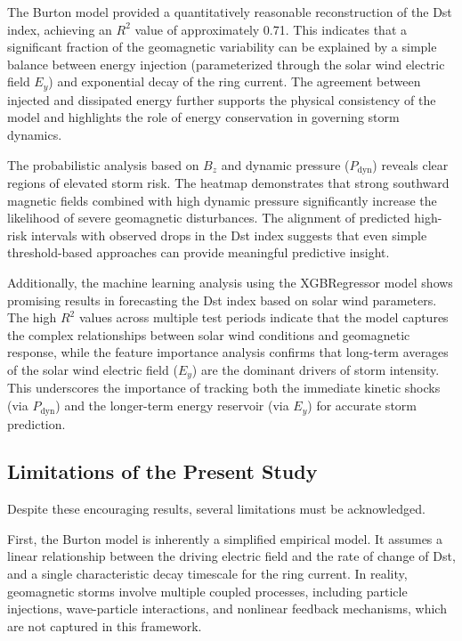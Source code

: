 \documentclass[12pt]{article}
\begin{document}
The Burton model provided a quantitatively reasonable reconstruction of the Dst index, achieving an $R^2$ value of approximately 0.71. This indicates that a significant fraction of the geomagnetic variability can be explained by a simple balance between energy injection (parameterized through the solar wind electric field $E_y$) and exponential decay of the ring current. The agreement between injected and dissipated energy further supports the physical consistency of the model and highlights the role of energy conservation in governing storm dynamics.

The probabilistic analysis based on $B_z$ and dynamic pressure ($P_{\mathrm{dyn}}$) reveals clear regions of elevated storm risk. The heatmap demonstrates that strong southward magnetic fields combined with high dynamic pressure significantly increase the likelihood of severe geomagnetic disturbances. The alignment of predicted high-risk intervals with observed drops in the Dst index suggests that even simple threshold-based approaches can provide meaningful predictive insight.

Additionally, the machine learning analysis using the XGBRegressor model shows promising results in forecasting the Dst index based on solar wind parameters. The high $R^2$ values across multiple test periods indicate that the model captures the complex relationships between solar wind conditions and geomagnetic response, while the feature importance analysis confirms that long-term averages of the solar wind electric field ($E_y$) are the dominant drivers of storm intensity. This underscores the importance of tracking both the immediate kinetic shocks (via $P_{\mathrm{dyn}}$) and the longer-term energy reservoir (via $E_y$) for accurate storm prediction.
\subsection{Limitations of the Present Study}

Despite these encouraging results, several limitations must be acknowledged.

First, the Burton model is inherently a simplified empirical model. It assumes a linear relationship between the driving electric field and the rate of change of Dst, and a single characteristic decay timescale for the ring current. In reality, geomagnetic storms involve multiple coupled processes, including particle injections, wave-particle interactions, and nonlinear feedback mechanisms, which are not captured in this framework.
\end{document}

